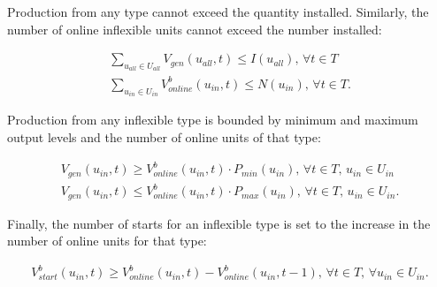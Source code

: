 \documentclass{article}
\begin{document}
Production from any type cannot exceed the quantity installed. Similarly, the number of online inflexible units cannot exceed the number installed:

\begin{align*}
    \sum_{u_{all} \in U_{all}} V_{gen}(u_{all}, t) \leq I(u_{all}) \text{, } \forall t \in T \\
    \sum_{u_{in} \in U_{in}} V_{online}^b(u_{in}, t) \leq N(u_{in}) \text{, } \forall t \in T.
\end{align*}

Production from any inflexible type is bounded by minimum and maximum output levels and the number of online units of that type:

\begin{align*}
    V_{gen}(u_{in},t) \geq V_{online}^b(u_{in},t) \cdot P_{min}(u_{in}) \text{, } \forall t \in T \text{, } u_{in} \in U_{in} \\
    V_{gen}(u_{in},t) \leq V_{online}^b(u_{in},t) \cdot P_{max}(u_{in}) \text{, } \forall t \in T \text{, } u_{in} \in U_{in}.   
\end{align*}

Finally, the number of starts for an inflexible type is set to the increase in the number of online units for that type:

\begin{align*}
    V_{start}^b(u_{in},t) \geq V_{online}^b(u_{in},t) - V_{online}^b(u_{in},t-1 ) \text{, } \forall t \in T \text{, } \forall u_{in} \in U_{in}.
\end{align*}
\end{document}
